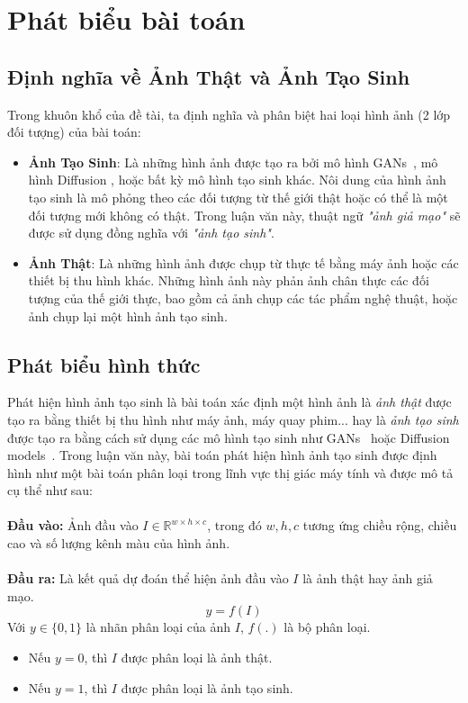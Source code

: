 \section{Phát biểu bài toán}
%
\subsection{Định nghĩa về Ảnh Thật và Ảnh Tạo Sinh}
Trong khuôn khổ của đề tài, ta định nghĩa và phân biệt hai loại hình ảnh (2 lớp đối tượng) của bài toán:
\begin{itemize}  

    \item \textbf{Ảnh Tạo Sinh}: Là những hình ảnh được tạo ra bởi mô hình GANs~\cite{Goodfellow2014GenerativeAN}, mô hình Diffusion \cite{Ho2020DenoisingDP}, hoặc bất kỳ mô hình tạo sinh khác. Nôi dung của hình ảnh tạo sinh là mô phỏng theo các đối tượng từ thế giới thật hoặc có thể là một đối tượng mới không có thật. Trong luận văn này, thuật ngữ \textit{"ảnh giả mạo"} sẽ được sử dụng đồng nghĩa với \textit{"ảnh tạo sinh"}.
    
    \item \textbf{Ảnh Thật}: Là những hình ảnh được chụp từ thực tế bằng máy ảnh hoặc các thiết bị thu hình khác. Những hình ảnh này phản ảnh chân thực các đối tượng của thế giới thực, bao gồm cả ảnh chụp các tác phẩm nghệ thuật, hoặc ảnh chụp lại một hình ảnh tạo sinh.

\end{itemize}
%
\subsection{Phát biểu hình thức}
%
Phát hiện hình ảnh tạo sinh là bài toán xác định một hình ảnh là \textit{ảnh thật} được tạo ra bằng thiết bị thu hình như máy ảnh, máy quay phim... hay là \textit{ảnh tạo sinh} được tạo ra bằng cách sử dụng các mô hình tạo sinh như GANs~\cite{Goodfellow2014GenerativeAN} hoặc Diffusion models~\cite{Ho2020DenoisingDP}. Trong luận văn này, bài toán phát hiện hình ảnh tạo sinh được định hình như một bài toán phân loại trong lĩnh vực thị giác máy tính và được mô tả cụ thể như sau:\\\\
%
\textbf{Đầu vào:} Ảnh đầu vào $I \in \mathbb{R}^{w \times h \times c}$, trong đó $w ,h, c$ tương ứng chiều rộng, chiều cao và số lượng kênh màu của hình ảnh.\\\\
%
\textbf{Đầu ra: } Là kết quả dự đoán thể hiện ảnh đầu vào $I$ là ảnh thật hay ảnh giả mạo.
\begin{equation}
y = f(I)
\end{equation}
Với  \( y \in \{0, 1\} \) là nhãn phân loại của ảnh \( I \), $f(.)$ là bộ phân loại.
\begin{itemize}
    \item Nếu \( y = 0 \), thì \( I \) được phân loại là ảnh thật.
    \item Nếu \( y = 1 \), thì \( I \) được phân loại là ảnh tạo sinh.
\end{itemize}
%
